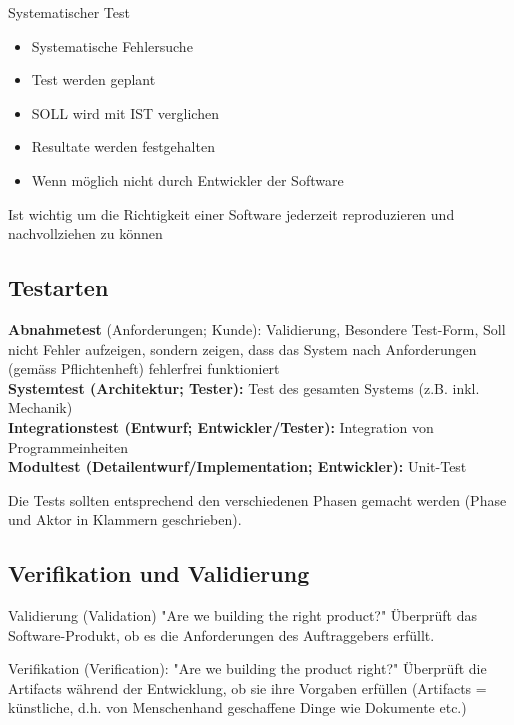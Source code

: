 Systematischer Test
\begin{itemize}
	\item Systematische Fehlersuche
	\item Test werden geplant
	\item SOLL wird mit IST verglichen
	\item Resultate  werden festgehalten
	\item Wenn möglich nicht durch Entwickler der 
	Software
\end{itemize}
Ist wichtig um die Richtigkeit einer Software 
jederzeit reproduzieren und nachvollziehen zu 
können

\subsection{Testarten}

\textbf{Abnahmetest} (Anforderungen; Kunde): Validierung, Besondere Test-Form, Soll nicht Fehler aufzeigen, sondern zeigen, dass das System nach Anforderungen
(gemäss Pflichtenheft) fehlerfrei funktioniert \\
\textbf{Systemtest (Architektur; Tester):} Test des gesamten Systems (z.B. inkl. Mechanik) \\ \textbf{Integrationstest (Entwurf; Entwickler/Tester):} Integration von Programmeinheiten \\
\textbf{Modultest (Detailentwurf/Implementation; Entwickler):} Unit-Test

Die Tests sollten entsprechend den verschiedenen Phasen gemacht werden (Phase und Aktor in Klammern geschrieben). 

\subsection{Verifikation und Validierung}
 Validierung  (Validation)
"Are we building the right product?"
Überprüft das Software-Produkt,
ob es die Anforderungen des Auftraggebers erfüllt.

Verifikation (Verification): 
"Are we building the product right?"
Überprüft die Artifacts während der Entwicklung,
ob sie ihre Vorgaben erfüllen
(Artifacts = künstliche, d.h. von Menschenhand geschaffene Dinge wie Dokumente etc.)

